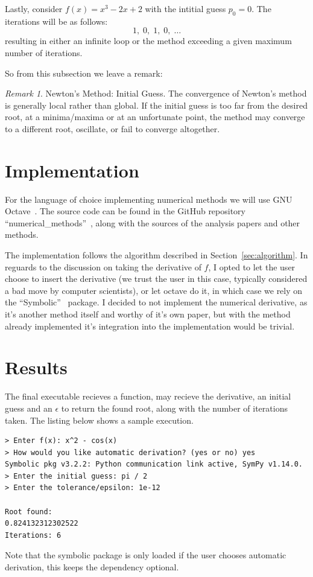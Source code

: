 \documentclass[12pt]{article}
\theoremstyle{remark}
\newtheorem{remark}{Remark}
\begin{document}
Lastly, consider $f(x) = x^3 - 2x + 2$ with the intitial guess $p_0 = 0$. The iterations will be as follows:
\[
  1,\; 0,\; 1,\; 0,\; \ldots
\]
resulting in either an infinite loop or the method exceeding a given maximum number of iterations.

So from this subsection we leave a remark:
\begin{remark}
Newton's Method: Initial Guess.
The convergence of Newton's method is generally local rather than global. If the initial guess is too far from the desired root, at a minima/maxima or at an unfortunate point, the method may converge to a different root, oscillate, or fail to converge altogether.
\end{remark}

\section{Implementation}\label{sec:implementation}

For the language of choice implementing numerical methods we will use GNU Octave~\cite{octave}. The source code can be found in the GitHub repository ``numerical\_methods''~\cite{repo}, along with the sources of the analysis papers and other methods.

The implementation follows the algorithm described in Section~\ref{sec:algorithm}. In reguards to the discussion on taking the derivative of $f$, I opted to let the user choose to insert the derivative (we trust the user in this case, typically considered a bad move by computer scientists), or let octave do it, in which case we rely on the ``Symbolic''~\cite{octave_symbolic} package. I decided to not implement the numerical derivative, as it's another method itself and worthy of it's own paper, but with the method already implemented it's integration into the implementation would be trivial.

\section{Results}\label{sec:results}

The final executable recieves a function, may recieve the derivative, an initial guess and an $\epsilon$ to return the found root, along with the number of iterations taken. The listing below shows a sample execution.
\begin{lstlisting}[caption={Sample execution of the program},label={lst:sample-run}]
> Enter f(x): x^2 - cos(x)
> How would you like automatic derivation? (yes or no) yes
Symbolic pkg v3.2.2: Python communication link active, SymPy v1.14.0.
> Enter the initial guess: pi / 2
> Enter the tolerance/epsilon: 1e-12

Root found:
0.824132312302522
Iterations: 6
\end{lstlisting}
Note that the symbolic package is only loaded if the user chooses automatic derivation, this keeps the dependency optional.
\end{document}
